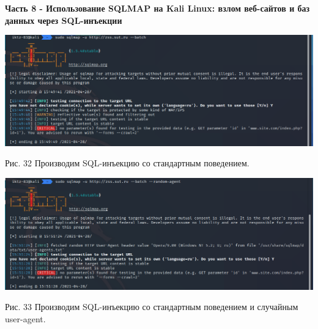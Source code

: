 \documentclass[a4paper,14pt]{extarticle}
\begin{document}
    \textbf{Часть 8 - Использование SQLMAP на Kali Linux: взлом веб-сайтов и
баз данных через SQL-инъекции}
    \begin{center}
        \includegraphics[scale=0.4]{pics/32.png}

        Рис. 32 Производим SQL-инъекцию со стандартным поведением.

        \includegraphics[scale=0.4]{pics/33.png}

        \begin{singlespace}
            Рис. 33 Производим SQL-инъекцию со стандартным поведением и случайным user-agent. 
        \end{singlespace}

    \end{center}
\end{document}
